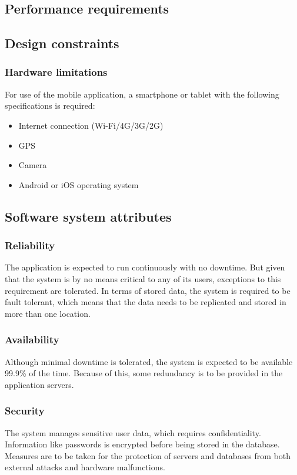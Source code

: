 \subsection{Performance requirements}

\subsection{Design constraints}

\subsubsection{Hardware limitations}

For use of the mobile application, a smartphone or tablet with the following specifications is required:
\begin{itemize}
   \item 
    Internet connection (Wi-Fi/4G/3G/2G)
   \item 
    GPS
   \item 
    Camera
   \item 
    Android or iOS operating system
\end{itemize}


\subsection{Software system attributes}
\subsubsection{Reliability}
The application is expected to run continuously with no downtime. But given that the system is by no means critical to any of its users, exceptions to this requirement are tolerated. In terms of stored data, the system is required to be fault tolerant, which means that the data needs to be replicated and stored in more than one location.

\subsubsection{Availability}
Although minimal downtime is tolerated, the system is expected to be available 99.9\% of the time. Because of this, some redundancy is to be provided in the application servers.

\subsubsection{Security}
The system manages sensitive user data, which requires confidentiality. Information like passwords is encrypted before being stored in the database.
Measures are to be taken for the protection of servers and databases from both external attacks and hardware malfunctions.


